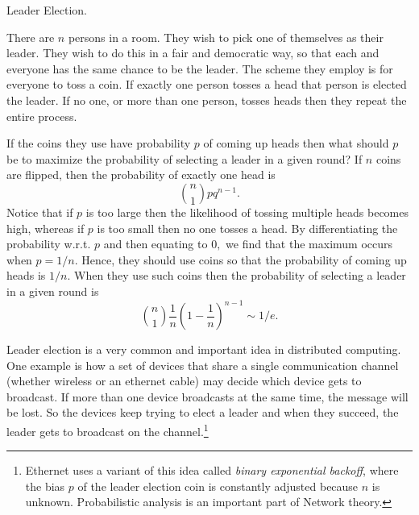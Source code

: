 \documentclass[11pt,twoside]{article}
\begin{document}
\begin{optional}

\begin{example} Leader Election.

There are $n$ persons in a room. They wish to pick one of themselves as
their leader. They wish to do this in a fair and democratic way, so that
each and everyone has the same chance to be the leader. The scheme they
employ is for everyone to toss a coin. If exactly one person tosses a head
that person is elected the leader.  If no one, or more than one person,
tosses heads then they repeat the entire process.

If the coins they use have probability $p$ of coming up heads then
what should $p$ be to maximize the probability of selecting a leader
in a given round?  If $n$ coins are flipped, then the probability of
exactly one head is
\[
\binom{n}{1} pq^{n-1}.
\]
Notice that if $p$ is too large then the likelihood of tossing multiple
heads becomes high, whereas if $p$ is too small then no one tosses a
head.  By differentiating the probability w.r.t. $p$ and then equating to
$0,$ we find that the maximum occurs when $p = 1/n$.  Hence, they should
use coins so that the probability of coming up heads is $1/n$.  When they
use such coins then the probability of selecting a leader in a given round
is
\[
\binom{n}{1}\frac{1}{n}(1 -\frac{1}{n})^{n-1} \sim 1/e.
\]

Leader election is a very common and important idea in distributed
computing. One example is how a set of devices that share a single
communication channel (whether wireless or an ethernet cable) may decide
which device gets to broadcast. If more than one device broadcasts at the
same time, the message will be lost. So the devices keep trying to elect a
leader and when they succeed, the leader gets to broadcast on the
channel.\footnote{Ethernet uses a variant of this idea called \emph{binary
exponential backoff}, where the bias $p$ of the leader election coin is
constantly adjusted because $n$ is unknown. Probabilistic analysis is an
important part of Network theory.}

\end{example}

\end{optional}
\end{document}
